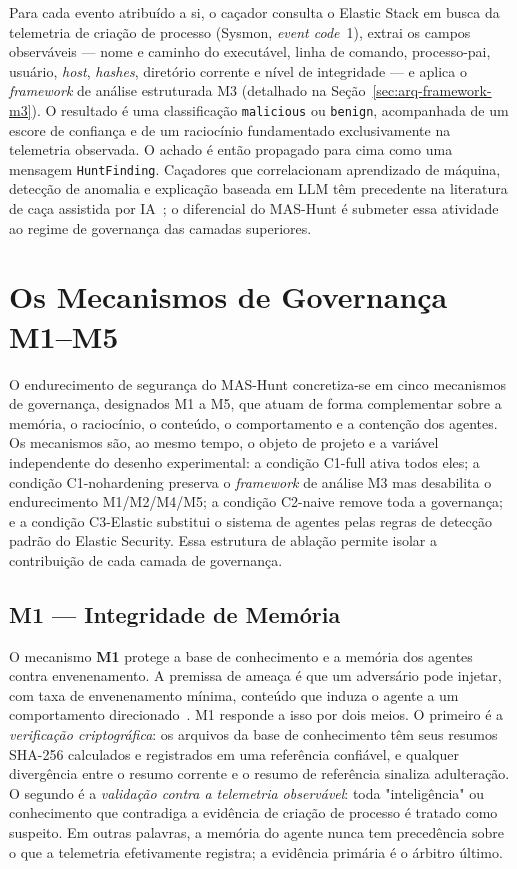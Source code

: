 Para cada evento atribuído a si, o caçador consulta o Elastic Stack em busca da
telemetria de criação de processo (Sysmon, \emph{event code}~1), extrai os campos
observáveis — nome e caminho do executável, linha de comando, processo-pai,
usuário, \emph{host}, \emph{hashes}, diretório corrente e nível de integridade —
e aplica o \emph{framework} de análise estruturada M3 (detalhado na
Seção~\ref{sec:arq-framework-m3}). O resultado é uma classificação
\texttt{malicious} ou \texttt{benign}, acompanhada de um escore de confiança e de
um raciocínio fundamentado exclusivamente na telemetria observada. O achado é
então propagado para cima como uma mensagem \texttt{HuntFinding}. Caçadores que
correlacionam aprendizado de máquina, detecção de anomalia e explicação baseada em
LLM têm precedente na literatura de caça assistida por
IA~\cite{ali2023huntgptintegratingmachinelearningbased}; o diferencial do
MAS-Hunt é submeter essa atividade ao regime de governança das camadas superiores.

\section{Os Mecanismos de Governança M1--M5}
\label{sec:arq-mecanismos}

O endurecimento de segurança do MAS-Hunt concretiza-se em cinco mecanismos de
governança, designados M1 a M5, que atuam de forma complementar sobre a memória,
o raciocínio, o conteúdo, o comportamento e a contenção dos agentes. Os
mecanismos são, ao mesmo tempo, o objeto de projeto e a variável independente do
desenho experimental: a condição C1-full ativa todos eles; a condição
C1-nohardening preserva o \emph{framework} de análise M3 mas desabilita o
endurecimento M1/M2/M4/M5; a condição C2-naive remove toda a governança; e a
condição C3-Elastic substitui o sistema de agentes pelas regras de detecção
padrão do Elastic Security. Essa estrutura de ablação permite isolar a
contribuição de cada camada de governança.

\subsection{M1 --- Integridade de Memória}
\label{sec:arq-m1}

O mecanismo \textbf{M1} protege a base de conhecimento e a memória dos agentes
contra envenenamento. A premissa de ameaça é que um adversário pode injetar, com
taxa de envenenamento mínima, conteúdo que induza o agente a um comportamento
direcionado~\cite{NEURIPS2024_eb113910}. M1 responde a isso por dois meios. O primeiro é a
\emph{verificação criptográfica}: os arquivos da base de conhecimento têm seus
resumos SHA-256 calculados e registrados em uma referência confiável, e qualquer
divergência entre o resumo corrente e o resumo de referência sinaliza adulteração.
O segundo é a \emph{validação contra a telemetria observável}: toda "inteligência"
ou conhecimento que contradiga a evidência de criação de processo é tratado como
suspeito. Em outras palavras, a memória do agente nunca tem precedência sobre o
que a telemetria efetivamente registra; a evidência primária é o árbitro último.

